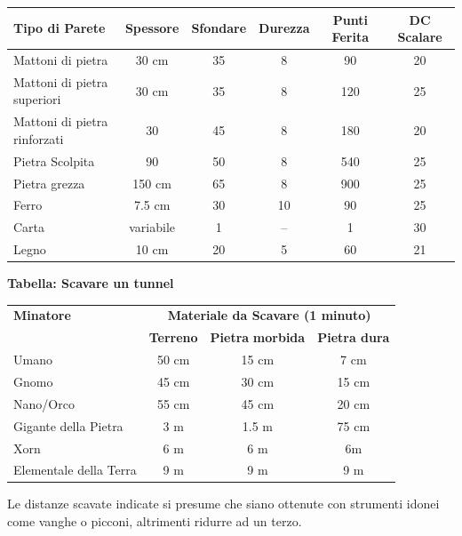 \noindent\begin{tabularx}{\linewidth}{Xccccc}
	\toprule
\rowcolor{gray!20}\textbf{Tipo di Parete} & \textbf{Spessore} & \textbf{Sfondare} & \textbf{Durezza} & \textbf{Punti Ferita} & \textbf{DC Scalare}\\
\toprule
Mattoni di pietra & 30 cm& 35 & 8 & 90& 20\\
\rowcolor{gray!20}Mattoni di pietra superiori & 30 cm& 35 & 8 & 120 & 25\\
Mattoni di pietra rinforzati & 30 & 45 & 8 & 180 & 20\\
\rowcolor{gray!20}Pietra Scolpita & 90 & 50 & 8 & 540 & 25\\
Pietra grezza & 150 cm & 65 & 8 & 900 & 25\\
\rowcolor{gray!20}Ferro & 7.5 cm & 30 & 10& 90& 25\\
Carta & variabile & 1 & --& 1 & 30\\
\rowcolor{gray!20}Legno & 10 cm& 20 & 5 & 60& 21
\end{tabularx}

\medskip

\textbf{Tabella: Scavare un tunnel}

\medskip

\noindent\begin{tabularx}{\linewidth}{Xccc}
	\toprule
\rowcolor{gray!20}\textbf{Minatore}&\multicolumn{3}{c}{\textbf{Materiale da Scavare (1 minuto)}}\\
&\textbf{Terreno}&\textbf{Pietra} \textbf{morbida}&\textbf{Pietra dura}\\
\toprule
Umano&50 cm&15 cm&7 cm\\
\rowcolor{gray!20}Gnomo &45 cm&30 cm&15 cm\\
Nano/Orco & 55 cm&45 cm&20 cm\\
\rowcolor{gray!20}Gigante della Pietra& 3 m& 1.5 m& 75 cm\\
Xorn &6 m&6 m& 6m\\
\rowcolor{gray!20}Elementale della Terra & 9 m&9 m&9 m
\end{tabularx}

\medskip

Le distanze scavate indicate si presume che siano ottenute con strumenti idonei come vanghe o picconi, altrimenti ridurre ad un terzo.

